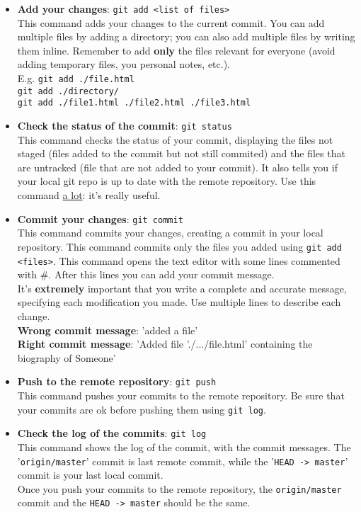 \documentclass[a4paper,12pt]{article}
\newcommand{\<}{\textless}
\renewcommand{\>}{\textgreater}
\begin{document}
\begin{itemize}
 \item \textbf{Add your changes}: \texttt{git add \<list of files\>}\\
 This command adds your changes to the current commit. You can add multiple files by adding a directory; you can also add multiple files by writing them inline. Remember to add \textbf{only} the files relevant for everyone (avoid adding temporary files, you personal notes, etc.).\\
 E.g. \texttt{git add ./file.html}\\
 \texttt{git add ./directory/}\\
 \texttt{git add ./file1.html ./file2.html ./file3.html}
 
 \item \textbf{Check the status of the commit}: \texttt{git status}\\
 This command checks the status of your commit, displaying the files not staged (files added to the commit but not still commited) and the files that are untracked (file that are not added to your commit). It also tells you if your local git repo is up to date with the remote repository. Use this command \underline{a lot}: it's really useful.
 
 \item \textbf{Commit your changes}: \texttt{git commit}\\
 This command commits your changes, creating a commit in your local repository. This command commits only the files you added using \texttt{git add \<files\>}. This command opens the text editor with some lines commented with \#. After this lines you can add your commit message.\\
 It's \textbf{extremely} important that you write a complete and accurate message, specifying each modification you made. Use multiple lines to describe each change.\\[.4em]
 \textbf{Wrong commit message}: 'added a file'\\
 \textbf{Right commit message}: 'Added file './.../file.html' containing the biography of Someone'

 \item \textbf{Push to the remote repository}: \texttt{git push}\\
 This command pushes your commits to the remote repository. Be sure that your commits are ok before pushing them using \texttt{git log}.
 
 \item \textbf{Check the log of the commits}: \texttt{git log}\\
 This command shows the log of the commit, with the commit messages. The '\texttt{origin/master}' commit is last remote commit, while the '\texttt{HEAD -> master}' commit is your last local commit.\\
 Once you push your commits to the remote repository, the \texttt{origin/master} commit and the \texttt{HEAD -> master} should be the same.
 
\end{itemize}
\end{document}
